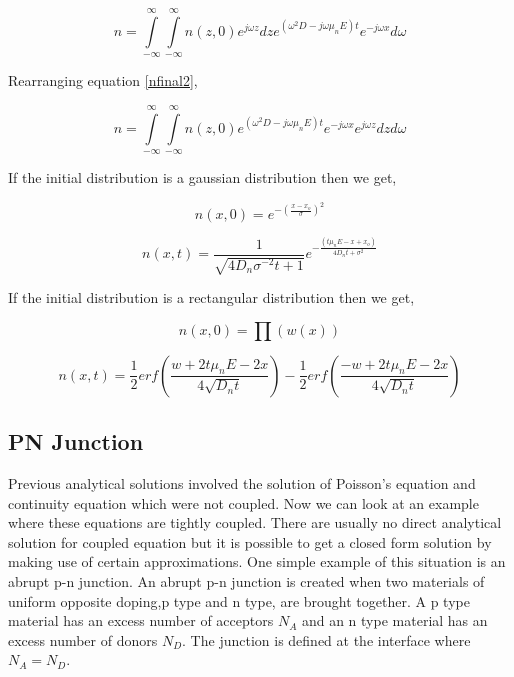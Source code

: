 \begin{equation}
n=\int\limits_{-\infty}^{\infty}\int\limits_{-\infty}^{\infty}n(z,0)e^{j\omega z}dz e^{(\omega ^2 D-j\omega \mu_n E)t}e^{-j\omega x}d\omega
\label{nfinal2}
\end{equation}

Rearranging equation \eqref{nfinal2},

\begin{equation}
n=\int\limits_{-\infty}^{\infty}\int\limits_{-\infty}^{\infty}n(z,0) e^{(\omega ^2 D-j\omega \mu_n E)t}e^{-j\omega x} e^{j\omega z}  dz d\omega
\end{equation}

If the initial distribution is a gaussian distribution then we get,

\begin{equation}
n(x,0)=e^{- (\frac{x-x_o}{\sigma})^2}
\end{equation}

\begin{equation}
n(x,t)=\frac{1}{\sqrt{4D_n\sigma^{-2}t+1}}e^{-\frac{(t\mu_n E-x+x_o)}{4D_n t+\sigma^2}}
\end{equation}

If the initial distribution is a rectangular distribution then we get,

\begin{equation}
n(x,0)=\prod (w(x))
\end{equation}

\begin{equation}
n(x,t)=\frac{1}{2} erf(\frac{w+2t \mu_n E-2x}{4\sqrt{D_n t}})-\frac{1}{2}erf(\frac{-w+2t \mu_n E-2x}{4\sqrt{D_n t}}) 
\end{equation}

\clearpage
\subsection{PN Junction}
Previous analytical solutions involved the solution of Poisson's equation and continuity equation which were not coupled. Now we can look at an example where these equations are tightly coupled. There are usually no direct analytical solution for coupled equation but it is possible to get a closed form solution by making use of certain approximations. One simple example of this situation is an abrupt p-n junction. An abrupt p-n junction is created when two materials of uniform opposite doping,p type and n type, are brought together. A p type material has an excess number of acceptors $N_A$ and an n type material has an excess number of donors $N_D$. The junction is defined at the interface where $N_A=N_D$. 

